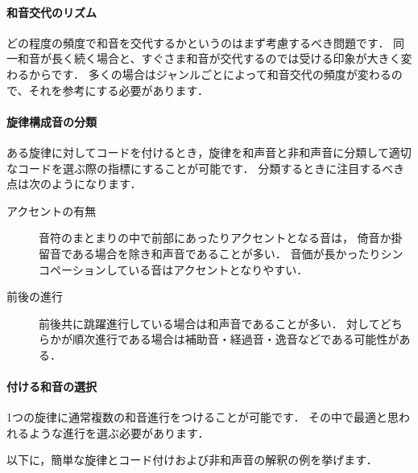 \documentclass[dvipdfmx,uplatex,b5paper,openany,jbase=12Q,nomag*,textwidth-limit=44%
               ]{gachimuchi}
\begin{document}
\paragraph{和音交代のリズム}
どの程度の頻度で和音を交代するかというのはまず考慮するべき問題です．
同一和音が長く続く場合と、すぐさま和音が交代するのでは受ける印象が大きく変わるからです．
多くの場合はジャンルごとによって和音交代の頻度が変わるので、それを参考にする必要があります．

\paragraph{旋律構成音の分類}
ある旋律に対してコードを付けるとき，旋律を和声音と非和声音に分類して適切なコードを選ぶ際の指標にすることが可能です．
分類するときに注目するべき点は次のようになります．
\begin{description}
  \item[アクセントの有無]
    音符のまとまりの中で前部にあったりアクセントとなる音は，
    倚音か掛留音である場合を除き和声音であることが多い．
    音価が長かったりシンコペーションしている音はアクセントとなりやすい．
  \item[前後の進行]
    前後共に跳躍進行している場合は和声音であることが多い．
    対してどちらかが順次進行である場合は補助音・経過音・逸音などである可能性がある．
\end{description}

\paragraph{付ける和音の選択}
1つの旋律に通常複数の和音進行をつけることが可能です．
その中で最適と思われるような進行を選ぶ必要があります．

以下に，簡単な旋律とコード付けおよび非和声音の解釈の例を挙げます．
\end{document}
